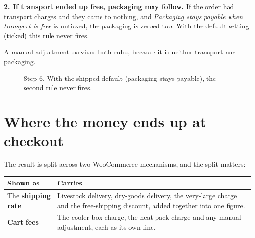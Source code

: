 \documentclass[11pt,a4paper,oneside]{report}
\newcommand{\R}[1]{R#1}
\begin{document}
\textbf{2. If transport ended up free, packaging may follow.} If the order had
transport charges and they came to nothing, and \emph{Packaging stays payable when
transport is free} is unticked, the packaging is zeroed too. With the default setting
(ticked) this rule never fires.

A manual adjustment survives both rules, because it is neither transport nor
packaging.

\begin{figure}[H]
\centering
{}
\caption{Step 6. With the shipped default (packaging stays payable), the second
rule never fires.}
\label{fig:step6}
\end{figure}

\section{Where the money ends up at checkout}

The result is split across two WooCommerce mechanisms, and the split matters:

\begin{longtable}{@{}L{4.4cm}L{10.4cm}@{}}
\toprule
\textbf{Shown as} & \textbf{Carries}\\
\midrule
\endhead
The \textbf{shipping rate} & Livestock delivery, dry-goods delivery, the very-large
charge and the free-shipping discount, added together into one figure.\\
\addlinespace
\textbf{Cart fees} & The cooler-box charge, the heat-pack charge and any manual
adjustment, each as its own line.\\
\bottomrule
\end{longtable}
\end{document}
